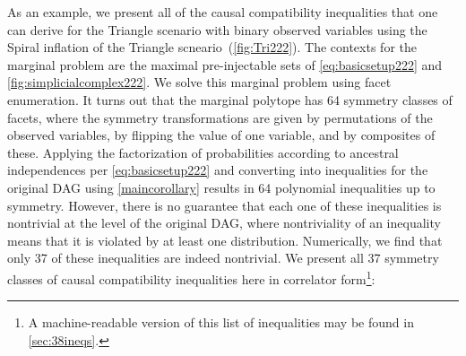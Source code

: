 \documentclass[aps,english,superscriptaddress,onecolumn,twoside,longbibliography,pra,floatfix,fleqn,nofootinbib]{revtex4-1}%
\theoremstyle{definition}
\begin{document}
As an example, 
we present all of the causal compatibility inequalities that one can derive for the Triangle scenario with binary observed variables using the Spiral inflation of the Triangle scneario~(\cref{fig:Tri222}). The contexts for the marginal problem are the maximal pre-injectable sets of \cref{eq:basicsetup222} and \cref{fig:simplicialcomplex222}. We solve this marginal problem using facet enumeration. It turns out that the marginal polytope has 64 symmetry classes of facets, where the symmetry transformations are given by permutations of the observed variables, by flipping the value of one variable, and by composites of these.
Applying the factorization of probabilities according to ancestral independences per \cref{eq:basicsetup222} and converting into inequalities for the original DAG using \cref{maincorollary} results in 64 polynomial inequalities up to symmetry. However, there is no guarantee that each one of these inequalities is nontrivial at the level of the original DAG, where nontriviality of an inequality means that it is violated by at least one distribution. Numerically, we find that only 37 of these inequalities are indeed nontrivial. We present all  37 symmetry classes of causal compatibility inequalities  here in correlator form\footnote{A machine-readable version of this list of inequalities may be found in \cref{sec:38ineqs}.}:
\end{document}

